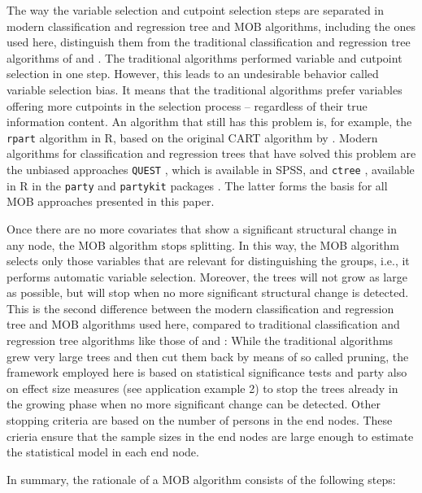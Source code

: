 \documentclass[doc,floatsintext,natbib]{apa7}
\begin{document}
The way the variable selection and cutpoint selection steps are separated in modern classification and regression tree and MOB algorithms, including the ones used here, distinguish them from the traditional classification and regression tree algorithms of \citet{Breetal:1984} and \citet{Qui:1993}. The traditional algorithms performed variable and cutpoint selection in one step. However, this leads to an undesirable behavior called variable selection bias. It means that the traditional algorithms prefer variables offering more cutpoints in the selection process -- regardless of their true information content. An algorithm that still has this problem is, for example, the \texttt{rpart} algorithm in R, based on the original CART algorithm by \citet{Breetal:1984}. Modern algorithms for classification and regression trees that have solved this problem are the unbiased approaches \texttt{QUEST} \citep{LohShi:1997}, which is available in SPSS, and \texttt{ctree} \citep{Hotetal:2006}, available in R in the \texttt{party} and \texttt{partykit} packages \citep{partykit:pkg}. The latter forms the basis for all MOB approaches presented in this paper. 

Once there are no more covariates that show a significant structural change in any node, the MOB algorithm stops splitting. In this way, the MOB algorithm selects only those variables that are relevant for distinguishing the groups, i.e., it performs automatic variable selection. Moreover, the trees will not grow as large as possible, but will stop when no more significant structural change is detected. This is the second difference between the modern classification and regression tree and MOB algorithms used here, compared to traditional classification and regression tree algorithms like those of \citet{Breetal:1984} and \citet{Qui:1993}: While the traditional algorithms grew very large trees and then cut them back by means of so called pruning, the framework employed here is based on statistical significance tests and party also on effect size measures (see application example 2) to stop the trees already in the growing phase when no more significant change can be detected. Other stopping criteria are based on the number of persons in the end nodes. These crieria ensure that the sample sizes in the end nodes are large enough to estimate the statistical model in each end node.

In summary, the rationale of a MOB algorithm consists of the following steps:
\end{document}
